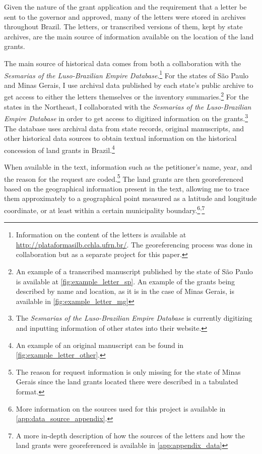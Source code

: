 \documentclass[11pt]{article}
\begin{document}
Given the nature of the grant application and the requirement that a letter be sent to the governor and approved, many of the letters were stored in archives throughout Brazil. 
The letters, or transcribed versions of them, kept by state archives, are the main source of information available on the location of the land grants.


The main source of historical data comes from both a collaboration with the \textit{Sesmarias of the Luso-Brazilian Empire Database}.\footnote{
  Information on the content of the letters is available at \url{http://plataformasilb.cchla.ufrn.br/}. The georeferencing process was done in collaboration but as a separate project for this paper.}
For the states of São Paulo and Minas Gerais, I use archival data published by each state's public archive to get access to either the letters themselves or the inventory summaries.\footnote{An example of a transcribed manuscript published by the state of São Paulo is available at \autoref{fig:example_letter_sp}. An example of the grants being described by name and location, as it is in the case of Minas Gerais, is available in \autoref{fig:example_letter_mg}}
For the states in the Northeast, I collaborated with the \textit{Sesmarias of the Luso-Brazilian Empire Database} in order to get access to digitized information on the grants.\footnote{The \textit{Sesmarias of the Luso-Brazilian Empire Database} is currently digitizing and inputting information of other states into their website.}
The database uses archival data from state records, original manuscripts, and other historical data sources to obtain textual information on the historical concession of land grants in Brazil.\footnote{An example of an original manuscript can be found in \autoref{fig:example_letter_other}.} 

When available in the text, information such as the petitioner's name, year, and the reason for the request are coded.\footnote{The reason for request information is only missing for the state of Minas Gerais since the land grants located there were described in a tabulated format.}
The land grants are then georeferenced based on the geographical information present in the text, allowing me to trace them approximately to a geographical point measured as a latitude and longitude coordinate, or at least within a certain municipality boundary.\footnote{More information on the sources used for this project is available in \autoref{app:data_source_appendix}.}\textsuperscript{,}\footnote{A more in-depth description of how the sources of the letters and how the land grants were georeferenced is available in \autoref{app:appendix_data}}
\end{document}
